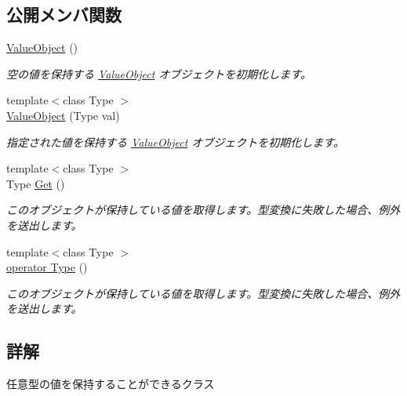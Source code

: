 \subsection*{公開メンバ関数}
\begin{DoxyCompactItemize}
\item 
\hyperlink{struct_reflection_1_1_value_object_a1cdbf247fc231bcc6eafe2f3cd60fc04}{Value\+Object} ()
\begin{DoxyCompactList}\small\item\em 空の値を保持する \hyperlink{struct_reflection_1_1_value_object}{Value\+Object} オブジェクトを初期化します。\end{DoxyCompactList}\item 
{\footnotesize template$<$class Type $>$ }\\\hyperlink{struct_reflection_1_1_value_object_aa50228eb33aa5a5b5c0c220414d6ea40}{Value\+Object} (Type val)
\begin{DoxyCompactList}\small\item\em 指定された値を保持する \hyperlink{struct_reflection_1_1_value_object}{Value\+Object} オブジェクトを初期化します。\end{DoxyCompactList}\item 
{\footnotesize template$<$class Type $>$ }\\Type \hyperlink{struct_reflection_1_1_value_object_a01ab084d58c123074ebbc155e901a23b}{Get} ()
\begin{DoxyCompactList}\small\item\em このオブジェクトが保持している値を取得します。型変換に失敗した場合、例外を送出します。\end{DoxyCompactList}\item 
{\footnotesize template$<$class Type $>$ }\\\hyperlink{struct_reflection_1_1_value_object_a65ae4ed69a132b5f156cc83a11129bd6}{operator Type} ()
\begin{DoxyCompactList}\small\item\em このオブジェクトが保持している値を取得します。型変換に失敗した場合、例外を送出します。\end{DoxyCompactList}\end{DoxyCompactItemize}


\subsection{詳解}
任意型の値を保持することができるクラス



